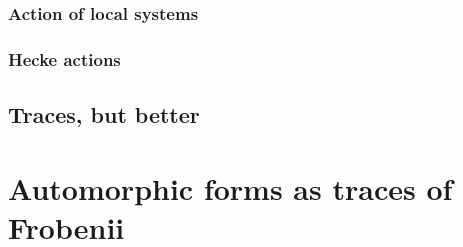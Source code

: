             \subsubsection{Action of local systems}
            
            \subsubsection{Hecke actions}
            
        \subsection{Traces, but better}
        
    \section{Automorphic forms as traces of Frobenii}